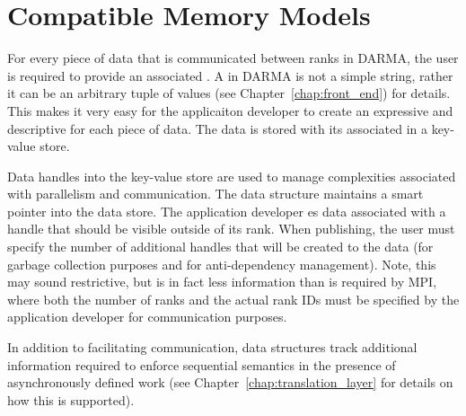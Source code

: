 \section{Compatible Memory Models}
\label{sec:mem_model}

For every piece of data that is communicated between \glspl{rank} in DARMA, the
user is required to provide an associated .  
A  in DARMA is not a simple
string, rather it can be an arbitrary \gls{tuple} of values (see Chapter~\ref{chap:front_end}) for details.
This makes it very easy for the applicaiton developer to create an expressive
and descriptive  for each piece of data.
The data is stored with its associated  in a \gls{key-value
store}.  


Data \glspl{handle} into the \gls{key-value store} are used to manage
complexities associated with parallelism and communication.  
The  data structure maintains a smart pointer into the data
store.  The application developer es data associated with a
handle that should be visible
outside of its \gls{rank}.  When publishing,  the user must specify the
number of additional handles that will be created to the data (for garbage
collection purposes and for \gls{anti-dependency} management).
Note, this may sound restrictive, but is in fact
less information than is required by \gls{MPI}, where both the number of
\glspl{rank} and the actual \gls{rank} IDs must be specified by the application developer
for communication purposes.

In addition to facilitating communication,  data structures track additional information required 
to enforce \gls{sequential semantics} in the presence of asynchronously defined
work (see Chapter~\ref{chap:translation_layer} for details on how this is supported).







